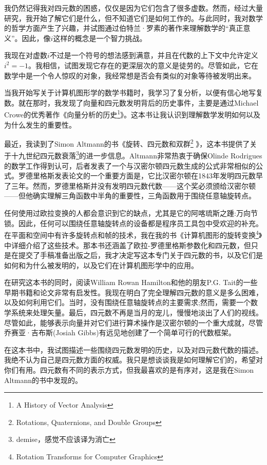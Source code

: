 我仍然记得我对四元数的困惑，仅仅是因为它们包含了很多虚数。然而，经过大量研究，我开始了解它们是什么，但不知道它们是如何工作的。与此同时，我对数学的哲学方面产生了兴趣，并试图通过伯特兰·罗素的著作来理解数学的“真正意义”。因此，像$i$这样的概念是一个智力挑战。

我现在对虚数$ i $不过是一个符号的想法感到满意，并且在代数的上下文中允许定义$ i ^{2}=-1$。我相信，试图发现它存在的更深层次的意义是徒劳的。尽管如此，它在数学中是一个令人惊叹的对象，我经常想是否会有类似的对象等待被发明出来。

当我开始写关于计算机图形学的数学书籍时，我学习了复分析，以便有信心地写复数。就在那时，我发现了向量和四元数发明背后的历史事件，主要是通过Michael Crowe的优秀著作《向量分析的历史\footnote{ A History of Vector Analysis}》。这本书让我认识到理解数学发明如何以及为什么发生的重要性。


最近，我读到了Simon Altmann的书《旋转、四元数和双群\footnote{Rotations, Quaternions, and Double Groups} 》，这本书提供了关于十九世纪四元数衰落\footnote{demise，感觉不应该译为消亡}的进一步信息。Altmann非常热衷于确保Olinde Rodrigues的数学工作得到认可，后者发表了一个与汉密尔顿四元数生成的公式非常相似的公式。罗德里格斯发表论文的一个重要方面是，它比汉密尔顿在1843年发明四元数早了三年。然而，罗德里格斯并没有发明四元数代数——这个奖必须颁给汉密尔顿——但他确实理解三角函数中半角的重要性，三角函数用于围绕任意轴旋转点。

任何使用过欧拉变换的人都会意识到它的缺点，尤其是它的阿喀琉斯之踵:万向节锁。因此，任何可以围绕任意轴旋转点的设备都是程序员工具包中受欢迎的补充。在平面和空间中有许多旋转点和帧的技术，我在我的书《计算机图形的旋转变换\footnote{Rotation Transforms for Computer Graphics}》中详细介绍了这些技术。那本书还涵盖了欧拉-罗德里格斯参数化和四元数，但只是在提交了手稿准备出版之后，我才决定写这本专门关于四元数的书，以及它们是如何和为什么被发明的，以及它们在计算机图形学中的应用。

在研究这本书的同时，阅读William Rowan Hamilton和他的朋友P.G. Tait的一些早期书籍和论文非常有启发性。我现在明白了完全理解四元数的意义是多么困难，以及如何利用它们。当时，没有围绕任意轴旋转点的主要需求;然而，需要一个数学系统来处理矢量。最后，四元数不再是当月的宠儿，慢慢地淡出了人们的视线。尽管如此，能够表示向量并对它们进行算术操作是汉密尔顿的一个重大成就，尽管乔赛亚·吉布斯(Josiah Gibbs)有远见地创建了一个简单可行的代数框架。

在这本书中，我试图描述一些围绕四元数发明的历史，以及对四元数代数的描述。我绝不认为自己是四元数方面的权威。我只是想谈谈我是如何理解它们的，希望对你们有用。四元数有不同的表示方式，但我最喜欢的是有序对，这是我在Simon Altmann的书中发现的。

